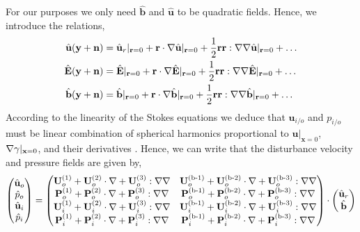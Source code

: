 For our purposes we only need $\hat{\textbf{b}}$ and $\hat{\textbf{u}}$ to be quadratic fields.
Hence, we introduce the relations, 
\begin{align*}
    \hat{\textbf{u}}(\textbf{y} + \textbf{n}) 
    &=  \hat{\textbf{u}}_r|_{\textbf{r}=0}
    +  \textbf{r} \cdot  \mathbf{\nabla}\hat{\textbf{u}}|_{\textbf{r}=0}
    +  \frac{1}{2}\textbf{rr} :  \mathbf{\nabla}\mathbf{\nabla}\hat{\textbf{u}}|_{\textbf{r}=0}
    + \ldots\\
     \hat{\textbf{E}}(\textbf{y} + \textbf{n}) 
    &=   \hat{\textbf{E}}|_{\textbf{r}=0}
    + \textbf{r} \cdot  \mathbf{\nabla} \hat{\textbf{E}}|_{\textbf{r}=0}
    + \frac{1}{2}\textbf{rr} :  \mathbf{\nabla}\mathbf{\nabla} \hat{\textbf{E}}|_{\textbf{r}=0}
    + \ldots\\
     \hat{\textbf{b}}(\textbf{y} + \textbf{n}) 
    &=   \hat{\textbf{b}}|_{\textbf{r}=0}
    + \textbf{r} \cdot  \mathbf{\nabla} \hat{\textbf{b}}|_{\textbf{r}=0}
    + \frac{1}{2}\textbf{rr} :  \mathbf{\nabla}\mathbf{\nabla} \hat{\textbf{b}}|_{\textbf{r}=0}
    + \ldots
\end{align*}
According to the linearity of the Stokes equations we deduce that $\textbf{u}_{i/o}$ and $p_{i/o}$  must be linear combination of spherical harmonics proportional to $\textbf{u}|_{\textbf{x}=0}$, $\mathbf{\nabla} \gamma|_{\textbf{x}=0}$, and their derivatives \citep{brenner1963resistance}.
Hence, we can write that the disturbance velocity and pressure fields are given by, 
\begin{align}
    \begin{pmatrix}
        \hat{\textbf{u}}_{o}\\
        \hat{p}_{o}\\
        \hat{\textbf{u}}_{i}\\
        \hat{p}_{i}
    \end{pmatrix}
    =
    \begin{pmatrix}
        \textbf{U}_{o}^{(1)} + \textbf{U}_{o}^{(2)}\cdot \grad + \textbf{U}_{o}^{(3)} :\grad\grad &
        \textbf{U}_{o}^\text{(b-1)} + \textbf{U}_{o}^\text{(b-2)}\cdot \grad + \textbf{U}_{o}^\text{(b-3)} :\grad\grad \\
        \textbf{P}_{o}^{(1)} + \textbf{P}_{o}^{(2)}\cdot \grad + \textbf{P}_{o}^{(3)} :\grad\grad &
        \textbf{P}_{o}^\text{(b-1)} + \textbf{P}_{o}^\text{(b-2)}\cdot \grad + \textbf{P}_{o}^\text{(b-3)} :\grad\grad \\
        \textbf{U}_{i}^{(1)} + \textbf{U}_{i}^{(2)}\cdot \grad + \textbf{U}_{i}^{(3)} :\grad\grad &
        \textbf{U}_{i}^\text{(b-1)} + \textbf{U}_{i}^\text{(b-2)}\cdot \grad + \textbf{U}_{i}^\text{(b-3)} :\grad\grad \\
        \textbf{P}_{i}^{(1)} + \textbf{P}_{i}^{(2)}\cdot \grad + \textbf{P}_{i}^{(3)} :\grad\grad &
        \textbf{P}_{i}^\text{(b-1)} + \textbf{P}_{i}^\text{(b-2)}\cdot \grad + \textbf{P}_{i}^\text{(b-3)} :\grad\grad \\
    \end{pmatrix}
    \cdot 
    \begin{pmatrix}
        \hat{\textbf{u}}_r\\
        \hat{\textbf{b}}
    \end{pmatrix}
    \label{eq:big_solution}
\end{align}
